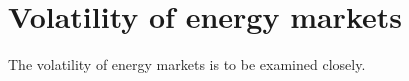 

\section{Volatility of energy markets}

The volatility of energy markets is to be examined closely. 
